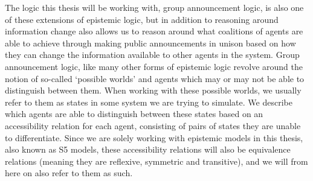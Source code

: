 






The logic this thesis will be working with, group announcement logic, is also one of these extensions of epistemic logic, but in addition to reasoning around information change also allows us to reason around what coalitions of agents are able to achieve through making public announcements in unison based on how they can change the information available to other agents in the system. Group announcement logic, like many other forms of epistemic logic revolve around the notion of so-called `possible worlds' and agents which may or may not be able to distinguish between them. When working with these possible worlds, we usually refer to them as states in some system we are trying to simulate. We describe which agents are able to distinguish between these states based on an accessibility relation for each agent, consisting of pairs of states they are unable to differentiate. Since we are solely working with epistemic models in this thesis, also known as S5 models, these accessibility relations will also be equivalence relations (meaning they are reflexive, symmetric and transitive), and we will from here on also refer to them as such.

